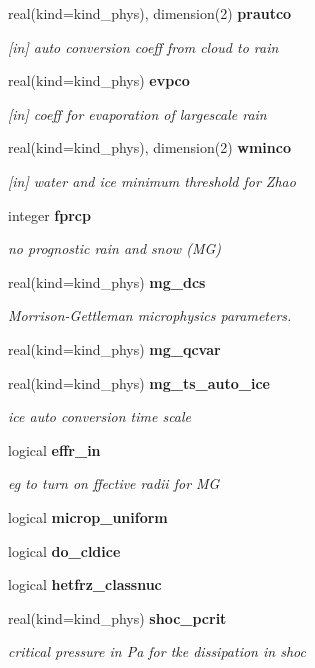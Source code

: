 \begin{DoxyCompactItemize}
real(kind=kind\+\_\+phys), dimension(2) \textbf{ prautco}
\begin{DoxyCompactList}\small\item\em [in] auto conversion coeff from cloud to rain \end{DoxyCompactList}\item 
real(kind=kind\+\_\+phys) \textbf{ evpco}
\begin{DoxyCompactList}\small\item\em [in] coeff for evaporation of largescale rain \end{DoxyCompactList}\item 
real(kind=kind\+\_\+phys), dimension(2) \textbf{ wminco}
\begin{DoxyCompactList}\small\item\em [in] water and ice minimum threshold for Zhao \end{DoxyCompactList}\item 
integer \textbf{ fprcp}
\begin{DoxyCompactList}\small\item\em no prognostic rain and snow (MG) \end{DoxyCompactList}\item 
real(kind=kind\+\_\+phys) \textbf{ mg\+\_\+dcs}
\begin{DoxyCompactList}\small\item\em Morrison-\/\+Gettleman microphysics parameters. \end{DoxyCompactList}\item 
real(kind=kind\+\_\+phys) \textbf{ mg\+\_\+qcvar}
\item 
real(kind=kind\+\_\+phys) \textbf{ mg\+\_\+ts\+\_\+auto\+\_\+ice}
\begin{DoxyCompactList}\small\item\em ice auto conversion time scale \end{DoxyCompactList}\item 
logical \textbf{ effr\+\_\+in}
\begin{DoxyCompactList}\small\item\em eg to turn on ffective radii for MG \end{DoxyCompactList}\item 
logical \textbf{ microp\+\_\+uniform}
\item 
logical \textbf{ do\+\_\+cldice}
\item 
logical \textbf{ hetfrz\+\_\+classnuc}
\item 
real(kind=kind\+\_\+phys) \textbf{ shoc\+\_\+pcrit}
\begin{DoxyCompactList}\small\item\em critical pressure in Pa for tke dissipation in shoc \end{DoxyCompactList}\item 

\end{DoxyCompactItemize}
